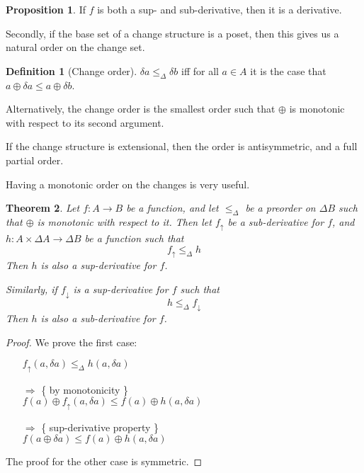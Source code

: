 \documentclass[english]{article}
\theoremstyle{plain}
\newtheorem{thm}{Theorem}
\theoremstyle{definition}
\newtheorem{prop}[thm]{Proposition}
\theoremstyle{remark}
\theoremstyle{remark}
\theoremstyle{remark}
\theoremstyle{definition}
\newtheorem{defn}{Definition}
\newcommand{\cplus}{\oplus}
\newcommand{\changes}[1]{\Delta #1}
\newcommand{\change}[1]{\delta #1}
\newcommand{\supderive}[1]{#1_\uparrow}
\newcommand{\subderive}[1]{#1_\downarrow}
\newcommand{\changeOrder}{\leq_\Delta}
\begin{document}
\begin{prop}
  If $f$ is both a sup- and sub-derivative, then it is a derivative.
\end{prop}

Secondly, if the base set of a change structure is a poset, then this gives us a natural
order on the change set.

\begin{defn}[Change order]
  $\change{a} \changeOrder \change{b}$ iff for all $a \in A$ it is the case that
  $a \cplus \change{a} \leq a \cplus \change{b}$.
\end{defn}

Alternatively, the change order is the smallest order such that $\cplus$ is monotonic with
respect to its second argument.

If the change structure is extensional, then the order is antisymmetric, and a
full partial order.

Having a monotonic order on the changes is very useful.

\begin{thm}
  Let $f: A \rightarrow B$ be a function, and let $\changeOrder$ be a preorder on $\changes{B}$ such that $\cplus$ is monotonic with
  respect to it. Then let $\supderive{f}$ be a sub-derivative for $f$, and $h: A \times
  \changes{A} \rightarrow \changes{B}$ be a function such that
  $$\supderive{f} \changeOrder h$$
  Then $h$ is also a sup-derivative for $f$.

  Similarly, if $\subderive{f}$ is a sup-derivative for $f$ such that 
  $$h \changeOrder \subderive{f}$$
  Then $h$ is also a sub-derivative for $f$.
\end{thm}
\begin{proof}
  We prove the first case:
  \begin{itemize}
    \item[ ]$\supderive{f}(a, \change{a}) \changeOrder h(a, \change{a})$
    \item[$\Rightarrow$]\{ by monotonicity \}\\
      $f(a) \cplus \supderive{f}(a, \change{a}) \leq f(a) \cplus h(a, \change{a})$
    \item[$\Rightarrow$]\{ sup-derivative property \}\\
      $f(a \cplus \change{a}) \leq f(a) \cplus h(a, \change{a})$
  \end{itemize}

  The proof for the other case is symmetric.
\end{proof}
\end{document}
